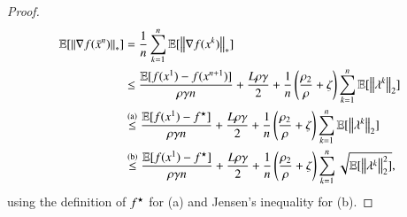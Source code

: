 \begin{toappendix}
\begin{proof}
\begin{equation*}
        \begin{aligned}
            \mathbb{E}[\left\Vert{\nabla f(\bar{x}^n)}\right\Vert_{\ast}]
                &= \frac{1}{n}\sum\limits_{k=1}^n\mathbb{E}[\left\Vert{\nabla f(x^k)}\right\Vert_{\ast}]\\
                &\leq \frac{\mathbb{E}[f(x^{1})-f(x^{n+1})]}{\rho\gamma n} +\frac{L\rho\gamma}{2} + \frac{1}{n}\left(\frac{\rho_2}{\rho}+\zeta\right)\sum\limits_{k=1}^n\mathbb{E}[\left\Vert{\lambda^{k}}\right\Vert_2]\\
                &\stackrel{\text{(a)}}{\leq} \frac{\mathbb{E}[f(x^{1})-f^\star]}{\rho\gamma n} +\frac{L\rho\gamma}{2} + \frac{1}{n}\left(\frac{\rho_2}{\rho}+\zeta\right)\sum\limits_{k=1}^n\mathbb{E}[\left\Vert{\lambda^{k}}\right\Vert_2]\\
                &\stackrel{\text{(b)}}{\leq} \frac{\mathbb{E}[f(x^{1})-f^\star]}{\rho\gamma n} +\frac{L\rho\gamma}{2} + \frac{1}{n}\left(\frac{\rho_2}{\rho}+\zeta\right)\sum\limits_{k=1}^n\sqrt{\mathbb{E}[\left\Vert{\lambda^{k}}\right\Vert_2^2]},
        \end{aligned}
    \end{equation*}
    using the definition of $f^\star$ for (a) and Jensen's inequality for (b).
\end{proof}


\end{toappendix}
